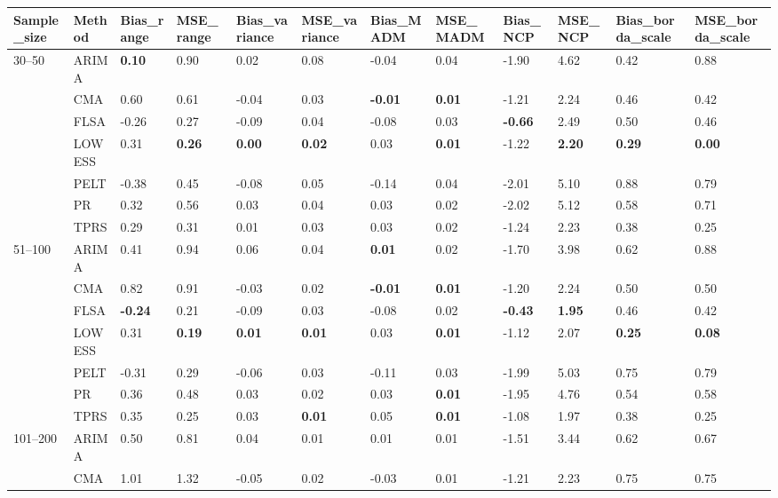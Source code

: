 \begin{table}[ht]
\centering
\begin{tabular}{llllllllllll}
  \toprule
Sample_size & Method & Bias_range & MSE_range & Bias_variance & MSE_variance & Bias_MADM & MSE_MADM & Bias_NCP & MSE_NCP & Bias_borda_scale & MSE_borda_scale \\ 
  \midrule
30–50 & ARIMA & \textbf{0.10} & 0.90 & 0.02 & 0.08 & -0.04 & 0.04 & -1.90 & 4.62 & 0.42 & 0.88 \\ 
   & CMA & 0.60 & 0.61 & -0.04 & 0.03 & \textbf{-0.01} & \textbf{0.01} & -1.21 & 2.24 & 0.46 & 0.42 \\ 
   & FLSA & -0.26 & 0.27 & -0.09 & 0.04 & -0.08 & 0.03 & \textbf{-0.66} & 2.49 & 0.50 & 0.46 \\ 
   & LOWESS & 0.31 & \textbf{0.26} & \textbf{0.00} & \textbf{0.02} & 0.03 & \textbf{0.01} & -1.22 & \textbf{2.20} & \textbf{0.29} & \textbf{0.00} \\ 
   & PELT & -0.38 & 0.45 & -0.08 & 0.05 & -0.14 & 0.04 & -2.01 & 5.10 & 0.88 & 0.79 \\ 
   & PR & 0.32 & 0.56 & 0.03 & 0.04 & 0.03 & 0.02 & -2.02 & 5.12 & 0.58 & 0.71 \\ 
   & TPRS & 0.29 & 0.31 & 0.01 & 0.03 & 0.03 & 0.02 & -1.24 & 2.23 & 0.38 & 0.25 \\ 
  51–100 & ARIMA & 0.41 & 0.94 & 0.06 & 0.04 & \textbf{0.01} & 0.02 & -1.70 & 3.98 & 0.62 & 0.88 \\ 
   & CMA & 0.82 & 0.91 & -0.03 & 0.02 & \textbf{-0.01} & \textbf{0.01} & -1.20 & 2.24 & 0.50 & 0.50 \\ 
   & FLSA & \textbf{-0.24} & 0.21 & -0.09 & 0.03 & -0.08 & 0.02 & \textbf{-0.43} & \textbf{1.95} & 0.46 & 0.42 \\ 
   & LOWESS & 0.31 & \textbf{0.19} & \textbf{0.01} & \textbf{0.01} & 0.03 & \textbf{0.01} & -1.12 & 2.07 & \textbf{0.25} & \textbf{0.08} \\ 
   & PELT & -0.31 & 0.29 & -0.06 & 0.03 & -0.11 & 0.03 & -1.99 & 5.03 & 0.75 & 0.79 \\ 
   & PR & 0.36 & 0.48 & 0.03 & 0.02 & 0.03 & \textbf{0.01} & -1.95 & 4.76 & 0.54 & 0.58 \\ 
   & TPRS & 0.35 & 0.25 & 0.03 & \textbf{0.01} & 0.05 & \textbf{0.01} & -1.08 & 1.97 & 0.38 & 0.25 \\ 
  101–200 & ARIMA & 0.50 & 0.81 & 0.04 & 0.01 & 0.01 & 0.01 & -1.51 & 3.44 & 0.62 & 0.67 \\ 
   & CMA & 1.01 & 1.32 & -0.05 & 0.02 & -0.03 & 0.01 & -1.21 & 2.23 & 0.75 & 0.75 \\ 

\end{tabular}
\end{table}
